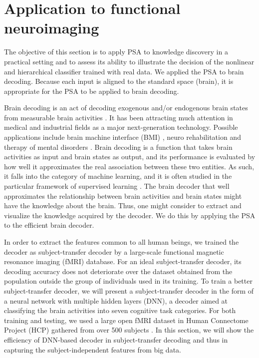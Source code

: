 \section{Application to functional neuroimaging}
\label{sec:application}

The objective of this section is to apply PSA to knowledge discovery in
a practical setting and to assess its ability to
illustrate the decision of the nonlinear and hierarchical classifier trained with real data.
%
We applied the PSA to brain decoding.
%
Because each input is aligned to the standard space (brain),
it is appropriate for the PSA to be applied to brain decoding.
%

Brain decoding is an act of decoding exogenous and/or endogenous brain states from measurable brain activities \cite{haxby2001distributed,cox2003functional,kamitani2005decoding,shibata2011perceptual,Horikawa2013}.
%
It has been attracting much attention in medical and industrial fields as a major next-generation technology.
%
Possible applications include brain machine interface
(BMI) \cite{laconte2011decoding}, neuro
rehabilitation \cite{sitaram2012acquired} and therapy of mental
disorders \cite{sitaram2007fmri}.
Brain decoding is a function that takes brain activities as input and
brain states as output, and its performance is evaluated by how well it
approximates the real association between these two entities.
%
As such, it falls into the category of machine learning, and it is often
studied in the particular framework of supervised learning \cite{lemm2011introduction}.
%
The brain decoder that well approximates the relationship between brain
activities and brain states might have the knowledge about the brain.
%
Thus, one might consider to extract and visualize the knowledge acquired by the decoder.
%
We do this by applying the PSA to the efficient brain decoder.

In order to extract the features common to all human beings,
we trained the decoder as subject-transfer decoder \cite{fazli2009subject,raizada2012makes,marquand2014bayesian}
by a large-scale functional magnetic resonance imaging (fMRI) database.
%
For an ideal subject-transfer decoder, its decoding accuracy does not
deteriorate over the dataset obtained from the population outside the
group of individuals used in its training.
%
To train a better subject-transfer decoder, we will present a
subject-transfer decoder in the form of a neural network with multiple
hidden layers (DNN), a decoder aimed at classifying the brain activities
into seven cognitive task categories.
%
For both training and testing, we used a large open fMRI dataset in Human
Connectome Project (HCP) gathered from over 500 subjects \cite{van2013wu}.
%
In this section, we will show the efficiency of DNN-based decoder
in subject-transfer decoding and thus in capturing
the subject-independent features from big data.

